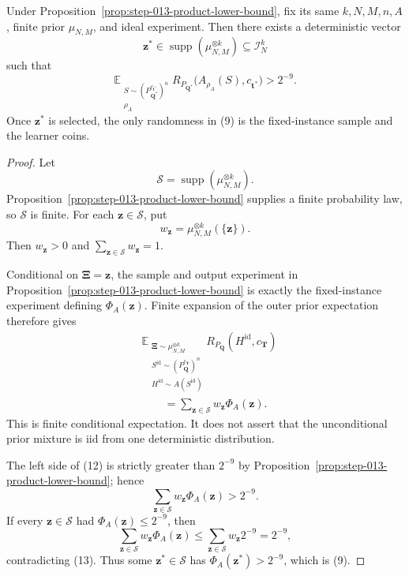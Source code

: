 \begin{proposition}\label{prop:step-014-fixed-extraction}
Under Proposition~\ref{prop:step-013-product-lower-bound}, fix its
same \(k,N,M,n,A\), finite prior \(\mu_{N,M}\), and ideal experiment. Then
there exists a deterministic vector
\[
\boldsymbol z^*\in\operatorname{supp}(\mu_{N,M}^{\otimes k})
\subseteq\mathcal I_N^k
\tag{8}
\]
such that
\[
\mathbb E_{\substack{S\sim(P_{\boldsymbol Q^*}^{c_{\boldsymbol t^*}})^n\\
\rho_A}}
R_{P_{\boldsymbol Q^*}}\bigl(A_{\rho_A}(S),c_{\boldsymbol t^*}\bigr)
>2^{-9}.
\tag{9}
\]
Once \(\boldsymbol z^*\) is selected, the only randomness in (9) is the
fixed-instance sample and the learner coins.
\end{proposition}

\begin{proof}
Let
\[
\mathcal S=\operatorname{supp}(\mu_{N,M}^{\otimes k}).
\tag{10}
\]
Proposition~\ref{prop:step-013-product-lower-bound} supplies a finite
probability law, so
\(\mathcal S\) is finite. For each \(\boldsymbol z\in\mathcal S\), put
\[
w_{\boldsymbol z}=\mu_{N,M}^{\otimes k}(\{\boldsymbol z\}).
\tag{11}
\]
Then \(w_{\boldsymbol z}>0\) and
\(\sum_{\boldsymbol z\in\mathcal S}w_{\boldsymbol z}=1\).

Conditional on \(\boldsymbol\Xi=\boldsymbol z\), the sample and output
experiment in Proposition~\ref{prop:step-013-product-lower-bound}
is exactly the fixed-instance experiment defining \(\Phi_A(\boldsymbol z)\).
Finite expansion of the outer prior expectation therefore gives
\[
\begin{aligned}
&\mathbb E_{\substack{
  \boldsymbol\Xi\sim\mu_{N,M}^{\otimes k}\\
  S^{\mathrm{id}}\sim(P_{\boldsymbol Q}^{c_{\boldsymbol T}})^n\\
  H^{\mathrm{id}}\sim A(S^{\mathrm{id}})}}
  R_{P_{\boldsymbol Q}}(H^{\mathrm{id}},c_{\boldsymbol T})\\
&\qquad=\sum_{\boldsymbol z\in\mathcal S}
  w_{\boldsymbol z}\Phi_A(\boldsymbol z).
\end{aligned}
\tag{12}
\]
This is finite conditional expectation. It does not assert that the
unconditional prior mixture is iid from one deterministic distribution.

The left side of (12) is strictly greater than \(2^{-9}\) by Proposition~\ref{prop:step-013-product-lower-bound}; hence
\[
\sum_{\boldsymbol z\in\mathcal S}w_{\boldsymbol z}\Phi_A(\boldsymbol z)
>2^{-9}.
\tag{13}
\]
If every \(\boldsymbol z\in\mathcal S\) had
\(\Phi_A(\boldsymbol z)\le2^{-9}\), then
\[
\sum_{\boldsymbol z\in\mathcal S}w_{\boldsymbol z}\Phi_A(\boldsymbol z)
\le\sum_{\boldsymbol z\in\mathcal S}w_{\boldsymbol z}2^{-9}
=2^{-9},
\tag{14}
\]
contradicting (13). Thus some \(\boldsymbol z^*\in\mathcal S\) has
\(\Phi_A(\boldsymbol z^*)>2^{-9}\), which is (9). \end{proof}

